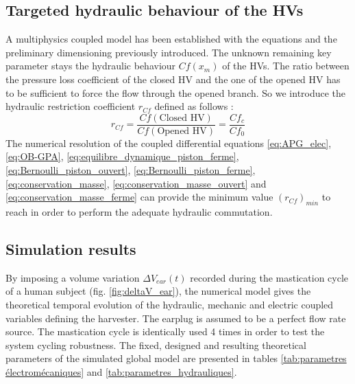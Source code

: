 \documentclass[3p,twocolumn,preprint]{elsarticle}
\begin{document}
	\subsection{Targeted hydraulic behaviour of the HVs}	
	\label{subsec:HV hydraulic targeted behaviour}
A multiphysics coupled model has been established with the equations and the preliminary dimensioning previously introduced. The unknown remaining key parameter stays the hydraulic behaviour $Cf(x_m)$ of the HVs. The ratio between the pressure loss coefficient of the closed HV and the one of the opened HV has to be sufficient to force the flow through the opened branch. So we introduce the hydraulic restriction coefficient $r_{Cf}$ defined as follows :
\begin{equation}
	r_{Cf} = \dfrac{Cf(\text{Closed HV})}{Cf(\text{Opened HV})}	= \dfrac{Cf_c}{Cf_0}	
	\label{eq:r_Cf_definition}
\end{equation}
The numerical resolution of the coupled differential equations \ref{eq:APG_elec},\ref{eq:OB-GPA}, \ref{eq:equilibre_dynamique_piston_ferme}, \ref{eq:Bernoulli_piston_ouvert}, \ref{eq:Bernoulli_piston_ferme}, \ref{eq:conservation_masse}, \ref{eq:conservation_masse_ouvert} and \ref{eq:conservation_masse_ferme} can provide the minimum value $(r_{Cf})_{min}$ to reach in order to perform the adequate hydraulic commutation.
	\subsection{Simulation results}	
	\label{subsec:Simulation results}
By imposing a volume variation $\Delta V_{ear}(t)$ recorded during the mastication cycle of a human subject (fig. \ref{fig:deltaV_ear}), the numerical model gives the theoretical temporal evolution of the hydraulic, mechanic and electric coupled variables defining the harvester. The earplug is assumed to be a perfect flow rate source. The mastication cycle is identically used 4 times in order to test the system cycling robustness. The fixed, designed and resulting theoretical parameters of the simulated global model are presented in tables \ref{tab:parametres électromécaniques} and \ref{tab:parametres_hydrauliques}.
\end{document}
